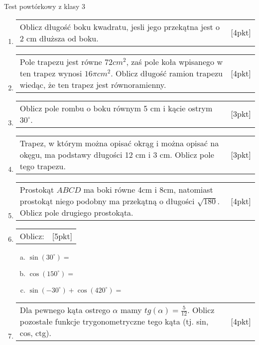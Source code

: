 \documentclass[12pt,a4paper]{article}
\begin{document}
	
	\begin{center}
		\LARGE Test powtórkowy z klasy 3
	\end{center}
	\vspace{1.5cm}
	
	\begin{enumerate}[1.]
		
	\item \begin{tabular}{p{13cm} r}
	Oblicz długość boku kwadratu, jesli jego przekątna jest o 2 cm dłuższa od boku. &[4pkt]\\ 
	\end{tabular}

	\item \begin{tabular}{p{13cm} r}
	Pole trapezu jest równe $72 cm^2$, zaś pole koła wpisanego w ten trapez wynosi $16\pi cm^2$. Oblicz długość ramion trapezu wiedąc, że ten trapez jest równoramienny.&[4pkt]\\ 
	\end{tabular}

	\item \begin{tabular}{p{13cm} r}
	Oblicz pole rombu o boku równym 5 cm i kącie ostrym $30^\circ$. &[3pkt]\\ 
	\end{tabular}

	\item \begin{tabular}{p{13cm} r}
	Trapez, w którym można opisać okrąg i można opisać na okęgu, ma podstawy długości 12 cm i 3 cm. Oblicz pole tego trapezu. &[3pkt]\\ 
	\end{tabular}

	\item \begin{tabular}{p{13cm} r}
	Prostokąt $ABCD$ ma boki równe 4cm i 8cm, natomiast prostokąt niego podobny ma przekątną o długości $\sqrt{180}$. Oblicz pole drugiego prostokąta. &[4pkt]\\ 
	\end{tabular}

	\item \begin{tabular}{p{13cm} r}
	Oblicz: &[5pkt]\\ 
	\end{tabular}
	\begin{enumerate}[a)]
		\item $\sin(30^\circ)=$
		\item $\cos(150^\circ)=$
		\item $\sin(-30^\circ)+\cos(420^\circ)=$ 
	\end{enumerate}

	\item \begin{tabular}{p{13cm} r}
	Dla pewnego kąta ostrego $\alpha$ mamy $tg(\alpha)=\frac{5}{12}$. Oblicz pozostałe funkcje trygonometryczne tego kąta (tj. sin, cos, ctg). &[4pkt]\\ 
	\end{tabular}

	\end{enumerate}
\end{document}
